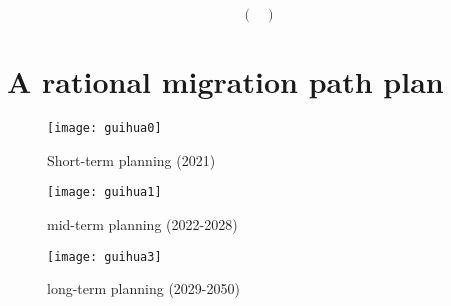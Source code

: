 \documentclass{mcmthesis}
\begin{document}
\begin{appendices}
\[\begin{pmatrix}
\end{pmatrix}
\]


\section{A rational migration path plan}
\begin{figure}[h]%
	\small
	\centering
	\texttt{[image: guihua0]}%
	\caption{Short-term planning (2021)}
\end{figure}
\begin{figure}[h]%
	\small
	\centering
	\texttt{[image: guihua1]}%
	\caption{mid-term planning (2022-2028)}
\end{figure}
\begin{figure}[h]%
	\small
	\centering
	\texttt{[image: guihua3]}%
	\caption{long-term planning (2029-2050)}
\end{figure}




\end{appendices}
\end{document}
